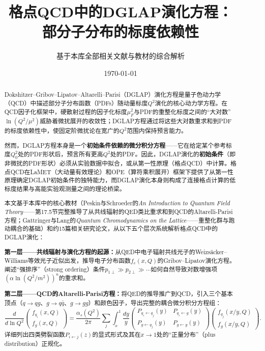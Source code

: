 \documentclass[12pt,a4paper]{ctexart}
\title{\heiti 格点QCD中的DGLAP演化方程：\\
部分子分布的标度依赖性}
\author{基于本库全部相关文献与教材的综合解析}
\date{\today}
\theoremstyle{definition}
\begin{document}
\maketitle

\begin{abstract}
\noindent
Dokshitzer--Gribov--Lipatov--Altarelli--Parisi（DGLAP）演化方程是量子色动力学（QCD）中描述部分子分布函数（PDFs）随动量标度$Q^2$演化的核心动力学方程。在QCD因子化框架中，硬散射过程的因子化标度$\mu_F^2$与PDF的重整化标度之间的``大对数''$\ln(Q^2/\mu^2)$威胁着微扰展开的收敛性；DGLAP方程通过将这些大对数重求和到PDF的标度依赖性中，使固定阶微扰论在宽广的$Q^2$范围内保持预言能力。

然而，DGLAP方程本身是一个\textbf{初始条件依赖的微分积分方程}——它在给定某个参考标度$Q_0^2$处的PDF形状后，预言所有更高$Q^2$处的PDF。因此，DGLAP演化的\textbf{初始条件}（即非微扰的PDF形状）必须从实验数据中拟合，或从第一性原理（格点QCD）中计算。格点QCD在LaMET（大动量有效理论）和OPE（算符乘积展开）框架下提供了从第一性原理确定DGLAP初始条件的独特能力，而DGLAP演化本身则构成了连接格点计算的低标度结果与高能实验观测量之间的理论桥梁。

本文基于本库中的核心教材（Peskin与Schroeder的\textit{An Introduction to Quantum Field Theory}——第17.5节完整推导了从共线辐射的QED类比重求和到QCD的Altarelli-Parisi方程；Gattringer与Lang的\textit{Quantum Chromodynamics on the Lattice}——重整化群与跑动耦合的基础）和约15篇相关研究论文，从以下五个层次系统解析格点QCD中的DGLAP演化：

\textbf{第一层——共线辐射与演化方程的起源：}从QED中电子辐射共线光子的Weizs\"acker--Williams等效光子近似出发，推导电子分布函数$f_e(x,Q)$的Gribov--Lipatov演化方程。阐述``强排序''（strong ordering）条件$p_{1\perp} \gg p_{2\perp} \gg \cdots$如何自然导致对数增强项$(\alpha\ln(Q^2/m^2))^n$的重求和。

\textbf{第二层——QCD的Altarelli-Parisi方程：}将QED的推导推广到QCD，引入三个基本顶点（$q\to qg$、$g\to q\bar q$、$g\to gg$）和颜色因子，导出完整的耦合微分积分方程组：
\begin{equation*}
\frac{d}{d\ln Q^2}
\begin{pmatrix} f_{q_i}(x,Q) \\ f_g(x,Q) \end{pmatrix}
= \frac{\alpha_s(Q^2)}{2\pi} \sum_j \int_x^1 \frac{dy}{y}
\begin{pmatrix} P_{q_i\leftarrow q_j}(y) & P_{q_i\leftarrow g}(y) \\ P_{g\leftarrow q_j}(y) & P_{g\leftarrow g}(y) \end{pmatrix}
\begin{pmatrix} f_{q_j}(x/y,Q) \\ f_g(x/y,Q) \end{pmatrix}.
\end{equation*}
详细列出四类劈裂函数$P_{i\leftarrow j}(z)$的显式形式及其在$x\to 1$处的``正量分布''（plus distribution）正规化。


\end{abstract}
\end{document}
